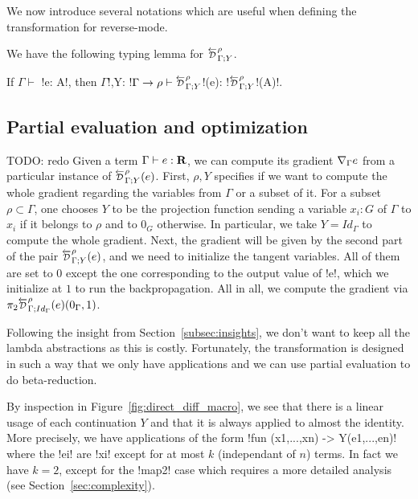 We now introduce several notations which are useful when defining the transformation for reverse-mode.



We have the following typing lemma for $\directD{\rho}{\Gamma}{Y}$.
\begin{lemma}
    If $\Gamma \vdash$ !e: A!, then $\Gamma$!,Y: !$\Gamma\to \rho \vdash \directD{\rho}{\Gamma}{Y}$!(e): !$\directD{\rho}{\Gamma}{Y}$!(A)!.
\end{lemma}



\subsection{Partial evaluation and optimization} %
\label{sub:Partial evaluation and optimization}

TODO: redo
Given a term $\Gamma\vdash e : \mathbf{R}$, we can compute its gradient $\nabla_\Gamma e$ from a particular instance of 
$\directD{\rho}{\Gamma}{Y}(e)$. First, $\rho, Y$ specifies if we want to compute the whole gradient regarding the variables from $\Gamma$ or a subset of it.
For a subset $\rho\subset \Gamma$, one chooses $Y$ to be the projection function sending a variable 
$x_i:G$ of $\Gamma$ to $x_i$ if it belongs to $\rho$ and to $0_G$ otherwise.
In particular, we take $Y=Id_\Gamma$ to compute the whole gradient.
Next, the gradient will be given by the second part of the pair $\directD{\rho}{\Gamma}{Y}(e)$, 
and we need to initialize the tangent variables. All of them are set to $0$ except the one corresponding to the output value of !e!, 
which we initialize at $1$ to run the backpropagation. 
All in all, we compute the gradient via $\pi_2\directD{\rho}{\Gamma}{Id_\Gamma}(e)(0_\Gamma,1)$.

Following the insight from Section~\ref{subsec:insights}, 
we don't want to keep all the lambda abstractions as this is costly. 
Fortunately, the transformation is designed in such a way that we only have applications 
and we can use partial evaluation to do beta-reduction. 

By inspection in Figure~\ref{fig:direct_diff_macro}, 
we see that there is a linear usage of  each continuation $Y$ 
and that it is always applied to almost the identity. 
More precisely, we have applications of the form !fun (x1,...,xn) -> Y(e1,...,en)! 
where the !ei! are !xi! except for at most $k$ (independant of $n$) terms.
In fact we have $k=2$, except for the !map2! case which requires a more detailed analysis (see Section~\ref{sec:complexity}).

